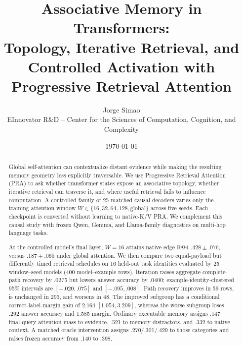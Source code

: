 \title{Associative Memory in Transformers:\\
Topology, Iterative Retrieval, and Controlled Activation with Progressive Retrieval Attention}
\author{Jorge Simao\\EInnovator R\&D -- Center for the Sciences of Computation, Cognition, and Complexity}
\date{\today}


\maketitle

\begin{abstract}
Global self-attention can contextualize distant evidence while making the resulting memory geometry
less explicitly traversable.  We use Progressive Retrieval Attention (PRA) to ask whether transformer
states expose an associative topology, whether iterative retrieval can traverse it, and where useful
retrieval fails to influence computation.  A controlled family of 25 matched causal decoders varies
only the training attention window $W\in\{16,32,64,128,\mathrm{global}\}$ across five seeds.  Each
checkpoint is converted without learning to native-K/V PRA.  We complement this causal study with
frozen Qwen, Gemma, and Llama-family diagnostics on multi-hop language tasks.

At the controlled model's final layer, $W=16$ attains native edge R@4 $.428\pm.076$, versus
$.187\pm.065$ under global attention.  We then compare two equal-payload but differently timed
retrieval schedules on 16 held-out task identities evaluated by 25 window--seed models (400
model--example rows).  Iteration raises aggregate complete-path recovery by .0275 but lowers answer
accuracy by .0400; example-identity-clustered 95\% intervals are $[-.020,.075]$ and $[-.095,.008]$.
Path recovery improves in 59 rows, is unchanged in 293, and worsens in 48.  The improved subgroup
has a conditional correct-label-margin gain of $2.164$ $[1.054,3.209]$, whereas the worse subgroup
loses .292 answer accuracy and 1.585 margin.  Ordinary executable memory assigns .147 final-query
attention mass to evidence, .521 to memory distractors, and .332 to native context.  A matched oracle
intervention assigns .270/.301/.429 to those categories and raises frozen accuracy from .140 to .398.


\end{abstract}
